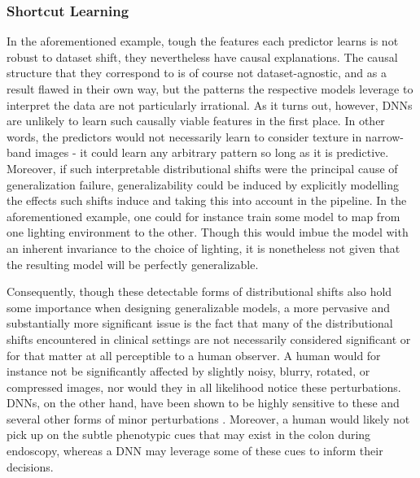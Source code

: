 		\subsubsection{Shortcut Learning}
		In the aforementioned example, tough the features each predictor learns is not robust to dataset shift, they nevertheless have causal explanations. The causal structure that they correspond to is of course not dataset-agnostic, and as a result flawed in their own way, but the patterns the respective models leverage to interpret the data are not particularly irrational. As it turns out, however, DNNs are unlikely to learn such causally viable features in the first place. In other words, the predictors would not necessarily learn to consider texture in narrow-band images - it could learn any arbitrary pattern so long as it is predictive. Moreover, if such interpretable distributional shifts were the principal cause of generalization failure, generalizability could be induced by explicitly modelling the effects such shifts induce and taking this into account in the pipeline. In the aforementioned example, one could for instance train some model to map from one lighting environment to the other. Though this would imbue the model with an inherent invariance to the choice of lighting, it is nonetheless not given that the resulting model will be perfectly generalizable.

		Consequently, though these detectable forms of distributional shifts also hold some importance when designing generalizable models, a more pervasive and substantially more significant issue is the fact that many of the distributional shifts encountered in clinical settings are not necessarily considered significant or for that matter at all perceptible to a human observer. A human would for instance not be significantly affected by slightly noisy, blurry, rotated, or compressed images, nor would they in all likelihood notice these perturbations. DNNs, on the other hand, have been shown to be highly sensitive to these and several other forms of minor perturbations \cite{noise_robustness, corruption_robustness,adversarial_training,benchmarking_robustness}. Moreover, a human would likely not pick up on the subtle phenotypic cues that may exist in the colon during endoscopy, whereas a DNN may leverage some of these cues to inform their decisions. 

